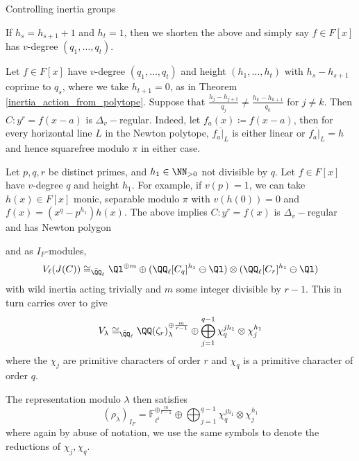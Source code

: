\documentclass[11pt,a4paper]{article}
\newcommand{\Fli}{\mathbb{F}_{\ell^i}}
\newcommand{\Dv}{\Delta_v}
\newcommand{\Qr}{{\QQ(\zeta_r)}}
\begin{document}
\begin{section}{Controlling inertia groups}
\begin{definition}
If $h_{s} =h_{s+1} +1 $ and $ h_t =1$, then we shorten the above and simply say $f \in F[x]$ has $v$-degree $(q_1, \ldots, q_t)$.
\end{definition}

\begin{remark} 
Let $f\in F[x]$ have $v$-degree $(q_1, \ldots, q_t)$ and height $(h_1, \ldots, h_t)$ with $h_s-h_{s+1}$  coprime to $q_s$, where we take $h_{t+1}=0$, as in Theorem \ref{inertia_action_from_polytope}. Suppose that $\frac{h_j-h_{j+1}}{q_j} \neq \frac{h_k-h_{k+1}}{q_k}$ for $j \neq k$.
Then $C\colon y^r=f(x-a)$ is $\Dv-$regular. Indeed, let $f_a(x)\coloneqq f(x-a)$, then for every horizontal line $L$ in the Newton polytope, $\overline{f_a|_L}$ is either linear or $\overline{f_a|_L} = h$ and hence squarefree modulo $\pi$ in either case. 
\end{remark}



\begin{example}
\label{example_one_prime}
Let $p,q,r$ be distinct primes, and $h_1 \in \NN_{>0}$ not divisible by $q$.
Let $f \in F[x]$ have $v$-degree $q$ and height $h_1$.
For example, if $v(p)=1$, we can take $h(x) \in F[x]$ monic, separable modulo $\pi$ with $v\left( h(0) \right) =0$ and  $f(x) = (x^q-p^{h_1})h(x)$.
The above implies $C\colon y^r=f(x)$ is $\Dv-$regular and has Newton polygon
\begin{center}
\end{center}
and as $I_F$-modules, \[V_\ell(J(C)) \cong_{\Bar{\QQ}_\ell}\Ql^{\oplus m} \oplus (\QQ_\ell[C_{q}]^{h_1} \ominus \Ql )\otimes (\QQ_\ell[C_{r}]^{h_1}  \ominus \Ql)\]
with wild inertia acting trivially and $m$ some integer divisible by $r-1$. This in turn carries over to give
\[V_\lambda \cong_{\Bar{\QQ}_\ell} \Qr_{\lambda}^{\oplus \frac{m}{r-1}} \oplus \bigoplus_{j=1}^{q-1} \chi_q^{jh_1} \otimes \chi_j^{h_1}\]
where the $\chi_j$ are primitive characters of order $r$ and $\chi_q$ is a primitive character of order $q$.

The representation modulo $\lambda$ then satisfies
\[ (\rho_\lambda)_{I_F} =  \Fli^{\oplus \frac{m}{r-1}} \oplus \bigoplus_{j=1}^{q-1} \chi_q^{jh_1} \otimes \chi_j^{h_1}
\]
where again by abuse of notation, we use the same symbols to denote the reductions of $ \chi_j, \chi_{q}$.


\end{example}
\end{section}
\end{document}
